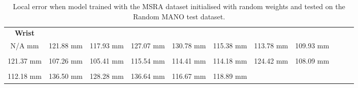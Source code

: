     \begin{table}[!ht]
    \begin{tabular}{|c|c|c|c|c|c|c|c|c|c|c|}
    \hline
    {\bfseries Wrist} & \cellcolor[HTML]{ff0000}{\bfseries IMCP} & \cellcolor[HTML]{ff0000}{\bfseries IPIP} & \cellcolor[HTML]{ff0000}{\bfseries IDIP} & \cellcolor[HTML]{ff0000}{\bfseries ITIP} & \cellcolor[HTML]{ff0000}{\bfseries MMCP} & \cellcolor[HTML]{ff0000}{\bfseries MPIP} & \cellcolor[HTML]{ff0000}{\bfseries MDIP}  \\
    N/A mm & \cellcolor[HTML]{ff0000}121.88 mm & \cellcolor[HTML]{ff0000}117.93 mm & \cellcolor[HTML]{ff0000}127.07 mm & \cellcolor[HTML]{ff0000}130.78 mm & \cellcolor[HTML]{ff0000}115.38 mm & \cellcolor[HTML]{ff0000}113.78 mm & \cellcolor[HTML]{ff0000}109.93 mm\\
    \hline
    \cellcolor[HTML]{ff0000}{\bfseries MTIP} & \cellcolor[HTML]{ff0000}{\bfseries RMCP} & \cellcolor[HTML]{ff0000}{\bfseries RPIP} & \cellcolor[HTML]{ff0000}{\bfseries RDIP} & \cellcolor[HTML]{ff0000}{\bfseries RTIP} & \cellcolor[HTML]{ff0000}{\bfseries PMCP} & \cellcolor[HTML]{ff0000}{\bfseries PPIP} & \cellcolor[HTML]{ff0000}{\bfseries PDIP}  \\
    \cellcolor[HTML]{ff0000}121.37 mm & \cellcolor[HTML]{ff0000}107.26 mm & \cellcolor[HTML]{ff0000}105.41 mm & \cellcolor[HTML]{ff0000}115.54 mm & \cellcolor[HTML]{ff0000}114.41 mm & \cellcolor[HTML]{ff0000}114.18 mm & \cellcolor[HTML]{ff0000}124.42 mm & \cellcolor[HTML]{ff0000}108.09 mm\\
    \hline
    \cellcolor[HTML]{ff0000}{\bfseries PTIP} & \cellcolor[HTML]{ff0000}{\bfseries TMCP} & \cellcolor[HTML]{ff0000}{\bfseries TPIP} & \cellcolor[HTML]{ff0000}{\bfseries PDIP} & \cellcolor[HTML]{ff0000}{\bfseries TTIP} & \cellcolor[HTML]{ff0000}{\bfseries Average}  \\
    \cellcolor[HTML]{ff0000}112.18 mm & \cellcolor[HTML]{ff0000}136.50 mm & \cellcolor[HTML]{ff0000}128.28 mm & \cellcolor[HTML]{ff0000}136.64 mm & \cellcolor[HTML]{ff0000}116.67 mm & \cellcolor[HTML]{ff0000}118.89 mm \\
    \cline{1-6}
    \end{tabular}
    \caption{Local error when model trained with the MSRA dataset initialised with random weights and tested on the Random MANO test dataset.}
    \label{tb:baseline_mano:l}
    \end{table}
